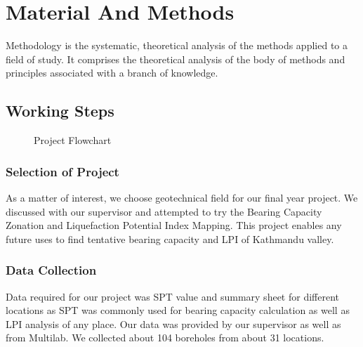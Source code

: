 \chapter{Material And Methods}
Methodology is the systematic, theoretical analysis of the methods applied to a field of study. It comprises the theoretical analysis of the body of methods and principles associated with a branch of knowledge.

\section{Working Steps}
\begin{figure}[hbt]
  \caption{Project Flowchart}
\end{figure}

\subsection{Selection of Project}
As a matter of interest, we choose geotechnical field for our final year project. We discussed with our supervisor and attempted to try the Bearing Capacity Zonation and Liquefaction Potential Index Mapping. This project enables any future uses to find tentative bearing capacity and LPI of Kathmandu valley.

\subsection{Data Collection}
Data required for our project was SPT value and summary sheet for different locations as SPT was commonly used for bearing capacity calculation as well as LPI analysis of any place. Our data was provided by our supervisor as well as from Multilab. We collected about 104 boreholes from about 31 locations.

